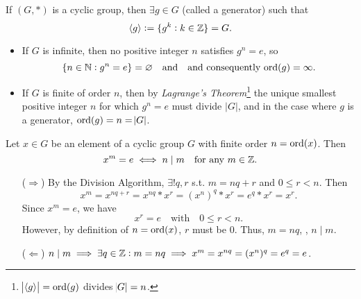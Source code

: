 \documentclass[11pt,openany]{article}
\begin{document}
\newpage
{}
\begin{remark*}
If \((G, \ast)\) is a cyclic group, then \(\exists g \in G \) (called a generator) such that \[
\langle g \rangle: = \{ g^k : k \in \mathbb{Z} \} = G.
\] \begin{itemize}
	\item If \( G \) is infinite, then no positive integer \( n \) satisfies \( g^n = e \), so \[
	\set{n\in\mathbb{N}:g^n=e}=\varnothing\quad\text{and}\quad\text{and consequently $\operatorname{ord}(g) = \infty$.}
	\]
	\item If \( G \) is finite of order \( n \), then by \emph{Lagrange’s Theorem}\footnote{\; $\abs{\langle g \rangle}=\operatorname*{ord}(g)$ divides $\abs{G}=n$.} the unique smallest positive integer \( n \) for which \( g^n = e \) must divide \(|G|\), and in the case where \( g \) is a generator, \(\operatorname*{ord}(g) = n = \abs{G}\).
\end{itemize}
\end{remark*}
\vfill
\begin{remark*}
	Let $x\in G$ be an element of a cyclic group $G$ with finite order $n=\operatorname*{ord}(x)$. Then \[
	x^m=e\iff n\mid m\quad\text{for any $m\in\mathbb{Z}$}.
	\]
	\begin{itemize}
		\item[($\Rightarrow$)] By the Division Algorithm, $\exists! q,r$ s.t. $m=nq+r$ and $0\leq r<n$. Then \[
		x^m=x^{nq+r}=x^{nq}\ast x^r=(x^n)^q\ast x^r=e^q\ast x^r=x^r.
		\] Since $x^m=e$, we have \[
		x^r=e\quad\text{with}\quad 0\leq r<n.
		\] However, by definition of $n=\operatorname*{ord}(x)$, $r$ must be 0. Thus, $m=nq$, \ie, $n\mid m$.
		\item[($\Leftarrow$)] $n\mid m\implies \exists q\in\mathbb{Z}: m=nq\implies x^m=x^{nq}=(x^{n})^q=e^q=e$.
	\end{itemize}
\end{remark*}
\end{document}
